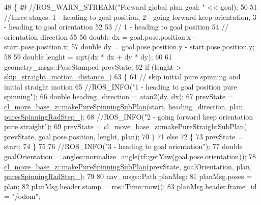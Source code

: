 \begin{DoxyCode}
48 \{
49     \textcolor{comment}{//ROS\_WARN\_STREAM("Forward global plan goal: " << goal);}
50 
51     \textcolor{comment}{//three stages: 1 - heading to goal position, 2 - going forward keep orientation, 3 - heading to goal
       orientation}
52 
53     \textcolor{comment}{// 1 - heading to goal position}
54     \textcolor{comment}{// orientation direction}
55 
56     \textcolor{keywordtype}{double} dx = goal.pose.position.x - start.pose.position.x;
57     \textcolor{keywordtype}{double} dy = goal.pose.position.y - start.pose.position.y;
58 
59     \textcolor{keywordtype}{double} lenght = sqrt(dx * dx + dy * dy);
60 
61     geometry\_msgs::PoseStamped prevState;
62     \textcolor{keywordflow}{if} (lenght > \hyperlink{classcl__move__base__z_1_1forward__global__planner_1_1ForwardGlobalPlanner_abafd101fa62caf2d74f118a0b4bb948c}{skip\_straight\_motion\_distance\_})
63     \{
64         \textcolor{comment}{// skip initial pure spinning and initial straight motion}
65         \textcolor{comment}{//ROS\_INFO("1 - heading to goal position pure spinning");}
66         \textcolor{keywordtype}{double} heading\_direction = atan2(dy, dx);
67         prevState = \hyperlink{namespacecl__move__base__z_ac774e138510eb7b5e0015be1f7709e19}{cl\_move\_base\_z::makePureSpinningSubPlan}(start, 
      heading\_direction, plan, \hyperlink{classcl__move__base__z_1_1forward__global__planner_1_1ForwardGlobalPlanner_a6aed6f8f6e57a8c5821977814d0b9402}{puresSpinningRadStep\_});
68         \textcolor{comment}{//ROS\_INFO("2 - going forward keep orientation pure straight");}
69         prevState = \hyperlink{namespacecl__move__base__z_a1d6998cc28a1847906272f2bf92bacc8}{cl\_move\_base\_z::makePureStraightSubPlan}(
      prevState, goal.pose.position, lenght, plan);
70     \}
71     \textcolor{keywordflow}{else}
72     \{
73         prevState = start;
74     \}
75 
76     \textcolor{comment}{//ROS\_INFO("3 - heading to goal orientation");}
77     \textcolor{keywordtype}{double} goalOrientation = angles::normalize\_angle(tf::getYaw(goal.pose.orientation));
78     \hyperlink{namespacecl__move__base__z_ac774e138510eb7b5e0015be1f7709e19}{cl\_move\_base\_z::makePureSpinningSubPlan}(prevState, 
      goalOrientation, plan, \hyperlink{classcl__move__base__z_1_1forward__global__planner_1_1ForwardGlobalPlanner_a6aed6f8f6e57a8c5821977814d0b9402}{puresSpinningRadStep\_});
79 
80     nav\_msgs::Path planMsg;
81     planMsg.poses = plan;
82     planMsg.header.stamp = ros::Time::now();
83     planMsg.header.frame\_id = \textcolor{stringliteral}{"/odom"};

\end{DoxyCode}
